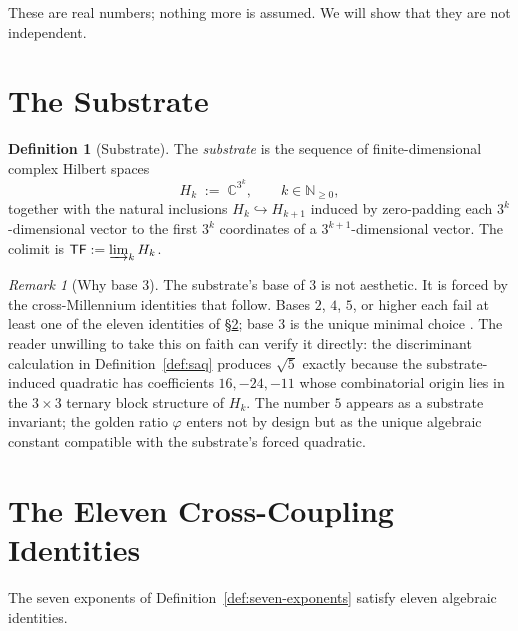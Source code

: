 \documentclass[11pt,a4paper]{article}
\theoremstyle{plain}
\theoremstyle{definition}
\newtheorem{definition}[theorem]{Definition}
\theoremstyle{remark}
\newtheorem{remark}[theorem]{Remark}
\newcommand{\Hk}{H_{k}}
\newcommand{\TF}{\mathsf{TF}}
\begin{document}
These are real numbers; nothing more is assumed. We will show
that they are not independent.

\section{The Substrate}
\label{sec:substrate}

\begin{definition}[Substrate]
\label{def:substrate}
The \emph{substrate} is the sequence of finite-dimensional
complex Hilbert spaces
\[
\Hk \;:=\; \mathbb{C}^{3^{k}}, \qquad k \in \mathbb{N}_{\ge 0},
\]
together with the natural inclusions
$\Hk \hookrightarrow H_{k+1}$ induced by zero-padding each
$3^{k}$-dimensional vector to the first $3^{k}$ coordinates of
a $3^{k+1}$-dimensional vector. The colimit is
$\TF := \varinjlim_{k} \Hk$.
\end{definition}

\begin{remark}[Why base $3$]
The substrate's base of $3$ is not aesthetic. It is forced by
the cross-Millennium identities that follow. Bases $2$, $4$, $5$,
or higher each fail at least one of the eleven identities of
\S\ref{sec:invariants}; base $3$ is the unique minimal choice
. The reader unwilling to take this on
faith can verify it directly: the discriminant calculation in
Definition~\ref{def:saq} produces $\sqrt{5}$ exactly because the
substrate-induced quadratic has coefficients $16, -24, -11$ whose
combinatorial origin lies in the $3 \times 3$ ternary block
structure of $\Hk$. The number $5$ appears as a substrate
invariant; the golden ratio $\varphi$ enters not by design but
as the unique algebraic constant compatible with the substrate's
forced quadratic.
\end{remark}

\section{The Eleven Cross-Coupling Identities}
\label{sec:invariants}

The seven exponents of Definition~\ref{def:seven-exponents}
satisfy eleven algebraic identities.
\end{document}

